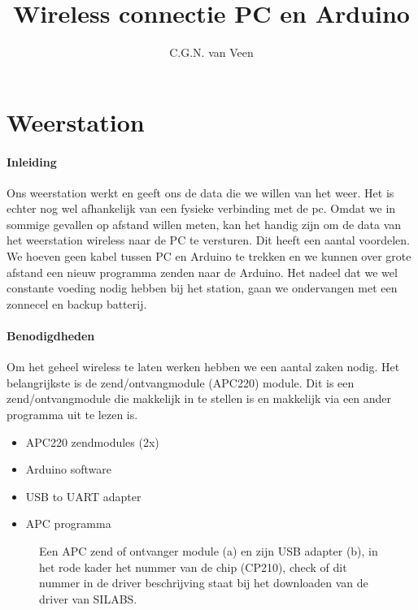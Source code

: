 

\title{Wireless connectie PC en Arduino}
\author{C.G.N. van Veen}



\maketitle

\section{Weerstation}

\paragraph{Inleiding} Ons weerstation werkt en geeft ons de data die we
willen van het weer. Het is echter nog wel afhankelijk van een fysieke
verbinding met de pc. Omdat we in sommige gevallen op afstand willen
meten, kan het handig zijn om de data van het weerstation wireless naar
de PC te versturen. Dit heeft een aantal voordelen. We hoeven geen kabel
tussen PC en Arduino te trekken en we kunnen over grote afstand een nieuw
programma zenden naar de Arduino. Het nadeel dat we wel constante
voeding nodig hebben bij het station, gaan we ondervangen met een
zonnecel en backup batterij. 

\paragraph{Benodigdheden}
Om het geheel wireless te laten werken hebben we een aantal zaken nodig.
Het belangrijkste is de zend/ontvangmodule (APC220) module. Dit is een 
zend/ontvangmodule die makkelijk in te stellen is en makkelijk via een ander 
programma uit te lezen is.

\begin{itemize}  
    \item APC220 zendmodules (2x)    
    \item Arduino software
    \item USB to UART adapter
    \item APC programma
\end{itemize}

\begin{figure}
    \centering
    \hfill
    \caption{Een APC zend of ontvanger module (a) en zijn USB adapter
    (b), in het rode kader het nummer van de chip (CP210), check of dit
    nummer in de driver beschrijving staat bij het downloaden van de
    driver van SILABS.}
\end{figure}

